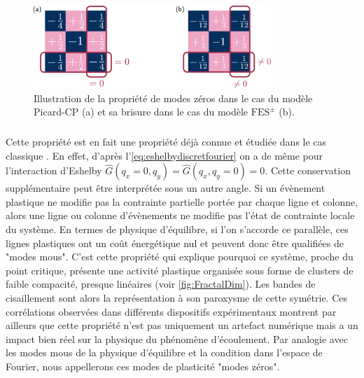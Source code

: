 \begin{figure}[h]
	\centering
	\includegraphics[width = 0.8\textwidth]{Chapitre4/Figures/CourtePortee/ZMCP.pdf}
	\caption{Illustration de la propriété de modes zéros dans le cas du modèle Picard-CP (a) et sa brisure dans le cas du modèle $\text{FES}^\pm$ (b).}
	\label{fig:Omodesshortrange}
\end{figure}

\subparagraph{}Cette propriété est en fait une propriété déjà connue et étudiée dans le cas classique \cite{tyukodi_depinning_2016, ferrero_elastic_2019}. En effet, d'après l'\autoref{eq:eshelbydiscretfourier} on a de même pour l'interaction d'Eshelby $\hat{G}(q_x=0,q_y)=\hat{G}(q_x,q_y=0)=0$. Cette conservation supplémentaire peut être interprétée sous un autre angle. Si un évènement plastique ne modifie pas la contrainte partielle portée par chaque ligne et colonne, alors une ligne ou colonne d'évènements ne modifie pas l'état de contrainte locale du système. En termes de physique d'équilibre, si l'on s'accorde ce parallèle, ces lignes plastiques ont un coût énergétique nul et peuvent donc être qualifiées de "modes mous". C'est cette propriété qui explique pourquoi ce système, proche du point critique, présente une activité plastique organisée sous forme de clusters de faible compacité, presque linéaires (voir \autoref{fig:FractalDim}). Les bandes de cisaillement \cite{martens_spontaneous_2012, rossi_finite-disorder_2022} sont alors la représentation à son paroxysme de cette symétrie. Ces corrélations observées dans différents dispositifs expérimentaux montrent par ailleurs que cette propriété n'est pas uniquement un artefact numérique mais a un impact bien réel sur la physique du phénomène d'écoulement. Par analogie avec les modes mous de la physique d'équilibre et la condition dans l'espace de Fourier, nous appellerons ces modes de plasticité "modes zéros". 


